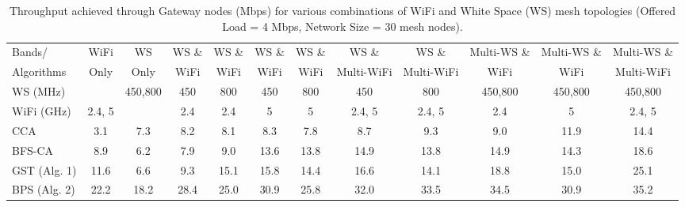 \begin{table}
\centering %
\begin{tabular}{|l|c|c|c|c|c|c|c|c|c|c|c|} %
\hline %
Bands/     & WiFi    & WS      & WS \& & WS \& &  WS \& & WS \& & WS \&      &  WS \&      & Multi-WS \& & Multi-WS \& & Multi-WS \& \\%
Algorithms & Only    & Only    & WiFi  & WiFi  &  WiFi  & WiFi  & Multi-WiFi &  Multi-WiFi & WiFi        & WiFi        & Multi-WiFi  \\
\hline %
WS (MHz)   &                                                        & 450,800 & 450 &  800  &  450   & 800               & 450    & 800      & 450,800     & 450,800     & 450,800     \\
\hline
WiFi (GHz) & 2.4, 5 &                                                             & 2.4 &  2.4  &  5   & 5               & 2.4, 5& 2.4, 5        & 2.4             & 5         & 2.4, 5     \\ %
\hline
\hline %
CCA~\cite{draves2004routing}                        & 3.1   &  7.3  & 8.2    &8.1    &8.3                &7.8     &   8.7    &   9.3&     9.0             &         11.9     &   14.4          \\      
\hline %
BFS-CA~\cite{ramachandran2006interference}  & 8.9   &  6.2  & 7.9    & 9.0   & 13.6       & 13.8   &  14.9    &   13.8&      14.9           &      14.3       &       18.6      \\      
\hline %
GST (Alg. 1)                                                            & 11.6  &   6.6 & 9.3    &   15.1&   15.8        &  14.4  &   16.6   &    14.1  &   18.8            &  15.0           &    25.1         \\      
\hline %
BPS (Alg. 2)                                                            & 22.2  & 18.2  &  28.4  & 25.0  & 30.9          & 25.8   &   32.0  &  33.5       &     34.5            &      30.9       &       35.2      \\      
\hline %
\end{tabular}    
\label{tab:2channelcombination}    
\caption{Throughput achieved through Gateway nodes (Mbps) for various combinations of WiFi and White Space (WS) mesh topologies (Offered Load = 4 Mbps, Network Size = 30 mesh nodes).} %
\vspace{-0.4in}
\end{table}    

